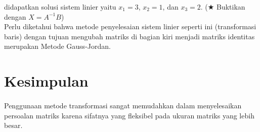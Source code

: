 \documentclass{article}   %
\begin{document}
didapatkan solusi sistem linier yaitu $x_1=3$, $x_2=1$, dan $x_3=2$. ($\bigstar$ Buktikan dengan $X=A^{-1}B$) \\

Perlu diketahui bahwa metode penyelesaian sistem linier seperti ini (transformasi baris) dengan tujuan mengubah matriks di bagian kiri menjadi matriks identitas merupakan Metode Gauss-Jordan.

		\section{Kesimpulan}
		\paragraph*{} Penggunaan metode transformasi sangat memudahkan dalam menyelesaikan persoalan matriks karena sifatnya yang fleksibel pada ukuran matriks yang lebih besar. 
		
\end{document}
